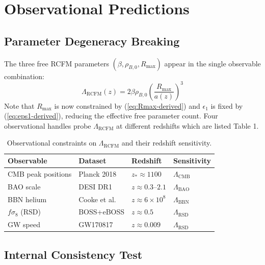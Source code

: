 \documentclass[10pt,twocolumn]{article}
\theoremstyle{definition}
\newcommand{\Rmax}{R_{\max}}
\DeclareRobustCommand{\onecoltable}[2][]{%
  \begin{table}[#1]%
    \centering
    #2
  \end{table}%
}
\begin{document}
\section{Observational Predictions}
\label{sec:obs}

\subsection{Parameter Degeneracy Breaking}

The three free RCFM parameters
\( (\beta,\rho_{B,0},\Rmax) \) appear in the single
observable combination:
\begin{equation}
  \Lambda_{\mathrm{RCFM}}(z)
    = 2\beta\rho_{B,0}\left(\frac{\Rmax}{a(z)}\right)^{3}
\end{equation}
Note that \( \Rmax \) is now constrained by
(\ref{eq:Rmax-derived}) and \( \epsilon_{1} \) is fixed by
(\ref{eq:eps1-derived}), reducing the effective free
parameter count.  
Four observational handles probe
\( \Lambda_{\mathrm{RCFM}} \) at different redshifts which are listed Table 1.

\onecoltable[htb]{%
  \centering
  \caption{Observational constraints on \( \Lambda_{\mathrm{RCFM}} \) and their redshift sensitivity.}
  \label{tab:constraints}
  \begin{tabular}{lllp{3.5cm}}
  \toprule
  Observable & Dataset & Redshift & Sensitivity\\
  \midrule
  CMB peak positions
    & Planck 2018 \citep{PlanckVI2020}
    & \( z_{*}\approx1100 \)
    & \( \Lambda_{\mathrm{CMB}} \)\\
  BAO scale
    & DESI DR1 \citep{DESI2024}
    & \( z\approx0.3 \)--$2.1$
    & \( \Lambda_{\mathrm{BAO}} \)\\
  BBN helium
    & Cooke et al.\ \citep{Cooke2018}
    & \( z\approx6\times10^{8} \)
    & \( \Lambda_{\mathrm{BBN}} \)\\
  \( f\sigma_{8} \) (RSD)
    & BOSS+eBOSS \citep{Alam2021}
    & \( z\approx0.5 \)
    & \( \Lambda_{\mathrm{RSD}} \)\\
  GW speed
    & GW170817 \citep{Abbott2017GW}
    & \( z\approx0.009 \)
    & \( \Lambda_{\mathrm{RSD}} \)\\
  \bottomrule
  \end{tabular}%
}

\subsection{Internal Consistency Test}
\end{document}
